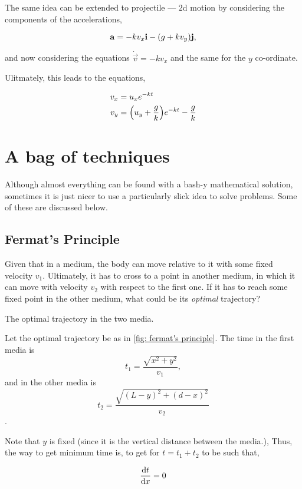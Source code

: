 The same idea can be extended to projectile --- \(2\)d motion 
by considering the components of the accelerations,

\[
    \boldsymbol{\mathbf{a}} = -kv_x \boldsymbol{\mathbf{i}} - (g + kv_y) \boldsymbol{\mathbf{j}},
\]

and now considering the equations \(\dot{\vec{v}} = -kv_x\)
and the same for the \(y\) co-ordinate. 

Ulitmately, this leads to the equations,

\begin{align}
    v_x &= u_x e^{-kt} \\
    v_y &= \qty(u_y + \frac{g}{k})e^{-kt} - \frac{g}{k}
\end{align}

\section{A bag of techniques}

Although almost everything can be found with a bash-y mathematical solution, sometimes 
it is just nicer to use a particularly slick idea to solve problems. Some of these are discussed 
below.

\subsection{Fermat's Principle}

Given that in a medium, the body can move relative to it with some fixed 
velocity \(v_1\). Ultimately, it has to cross to a point in another medium, in which 
it can move with velocity \(v_2\) with respect to the first one. If it has to reach 
some fixed point in the other medium, what could be its \emph{optimal} trajectory?

\begin{marginfigure}
    \centering
    \caption{The optimal trajectory in the two media.}
    \label{fig: fermat's principle}
\end{marginfigure}

Let the optimal trajectory be as in \cref{fig: fermat's principle}. The time in the first media
is \[t_1 = \frac{\sqrt{x^2 + y^2}}{v_1},\] and in the other media is \[t_2 = \frac{\sqrt{(L-y)^2 + (d-x)^2}}{v_2}\].

Note that \(y\) is fixed (since it is the vertical distance between the media.), Thus, 
the way to get minimum time is, to get for \(t = t_1 + t_2\) to be such that,

\begin{equation*}
    \dv{t}{x} = 0
\end{equation*}

